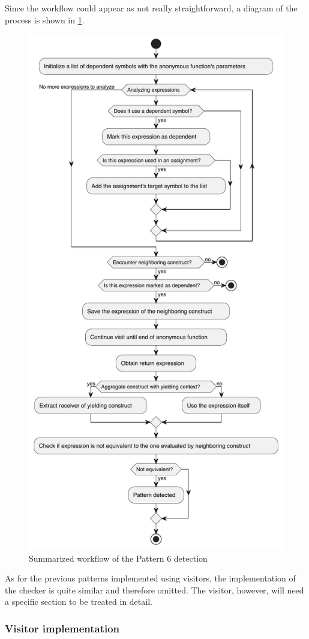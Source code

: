 \documentclass[12pt,a4paper,openright,twoside]{book}
\begin{document}
Since the workflow could appear as not really straightforward, a diagram of the
process is shown in \cref{fig:p6-workflow}.
%
\begin{figure}
  \centering
  \includegraphics[width=.6\linewidth]{figures/p6-workflow.pdf}
  \caption{Summarized workflow of the Pattern 6 detection}
  \label{fig:p6-workflow}
\end{figure}
%
As for the previous patterns implemented using visitors, the implementation of
the checker is quite similar and therefore omitted. The visitor, however, will
need a specific section to be treated in detail. 

\subsubsection{Visitor implementation}
\end{document}
